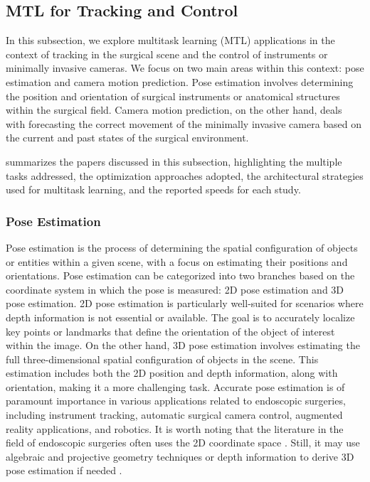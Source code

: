 \subsection{MTL for Tracking and Control} \label{sec::mtl_surgical::pose_automatic_camera}

In this subsection, we explore multitask learning (MTL) applications in the context of tracking in the surgical scene and the control of instruments or minimally invasive cameras. We focus on two main areas within this context: pose estimation and camera motion prediction. Pose estimation involves determining the position and orientation of surgical instruments or anatomical structures within the surgical field. Camera motion prediction, on the other hand, deals with forecasting the correct movement of the minimally invasive camera based on the current and past states of the surgical environment.


 summarizes the papers discussed in this subsection, highlighting the multiple tasks addressed, the optimization approaches adopted, the architectural strategies used for multitask learning, and the reported speeds for each study.


\subsubsection{Pose Estimation}
Pose estimation is the process of determining the spatial configuration of objects or entities within a given scene, with a focus on estimating their positions and orientations. Pose estimation can be categorized into two branches based on the coordinate system in which the pose is measured: 2D pose estimation and 3D pose estimation.
2D pose estimation is particularly well-suited for scenarios where depth information is not essential or available. The goal is to accurately localize key points or landmarks that define the orientation of the object of interest within the image.
On the other hand, 3D pose estimation involves estimating the full three-dimensional spatial configuration of objects in the scene. This estimation includes both the 2D position and depth information, along with orientation, making it a more challenging task.
Accurate pose estimation is of paramount importance in various applications related to endoscopic surgeries, including instrument tracking, automatic surgical camera control, augmented reality applications, and robotics. It is worth noting that the literature in the field of endoscopic surgeries often uses the 2D coordinate space \citep{multi_semi_pose,concurrent_segmentation_iro_laina,art_net,learning_look_tracking,Islam2020_ST_MTL,li2021data}. 
Still, it may use algebraic and projective geometry techniques or depth information to derive 3D pose estimation if needed \citep{art_net,li2021data}. 


